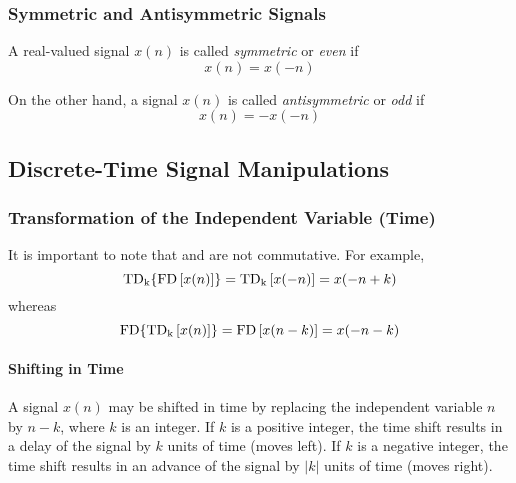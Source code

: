 \subsubsection{Symmetric and Antisymmetric Signals}\label{subsubsec:Symmetric and Antisymmetric Signals}
A real-valued signal $x(n)$ is called \emph{symmetric} or \emph{even} if
\begin{equation}\label{eq:Symmetric Signal}
  x(n) = x(-n)
\end{equation}

On the other hand, a signal $x(n)$ is called \emph{antisymmetric} or \emph{odd} if
\begin{equation}\label{eq:Asymmetric Signal}
  x(n) = -x(-n)
\end{equation}

\subsection{Discrete-Time Signal Manipulations}\label{subsec:Discrete-Time Signal Manipulations}
\subsubsection{Transformation of the Independent Variable (Time)}\label{subsubsec:Transform Independent Variable}
It is important to note that  and  are not commutative.
For example,
\begin{equation}\label{eq:Delay then Fold}
  \operatorname{\mathrm{TD}_{k}} \lbrace \operatorname{\mathrm{FD}} \left[ x(n) \right] \rbrace = \operatorname{\mathrm{TD}_{k}} \left[ x(-n) \right] = x(-n + k)
\end{equation}
whereas
\begin{equation}\label{eq:Fold then Delay}
  \operatorname{\mathrm{FD}} \lbrace \operatorname{\mathrm{TD}_{k}} \left[ x(n) \right] \rbrace = \operatorname{\mathrm{FD}} \left[ x(n-k) \right] = x(-n-k)
\end{equation}

\paragraph{Shifting in Time}\label{par:Shifting in Time}
A signal $x(n)$ may be shifted in time by replacing the independent variable $n$ by $n-k$, where $k$ is an integer.
If $k$ is a positive integer, the time shift results in a delay of the signal by $k$ units of time (moves left).
If $k$ is a negative integer, the time shift results in an advance of the signal by $\lvert k \rvert$ units of time (moves right).

